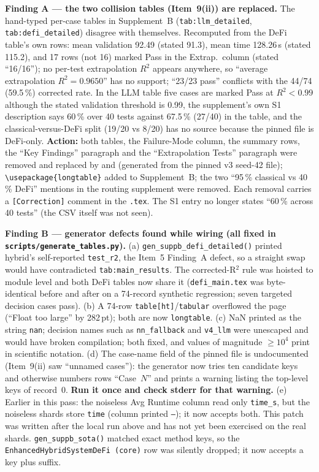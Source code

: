 \documentclass[11pt]{article}
\begin{document}
\textbf{Finding A --- the two collision tables (Item~9(ii)) are replaced.} The hand-typed per-case tables in Supplement~B
(\texttt{tab:llm\_detailed}, \texttt{tab:defi\_detailed}) disagree with themselves. Recomputed from the DeFi table's own
rows: mean validation 92.49 (stated 91.3), mean time 128.26\,s (stated 115.2), and 17 rows (not 16) marked Pass in the
Extrap.\ column (stated ``16/16''); no per-test extrapolation $R^2$ appears anywhere, so ``average extrapolation
$R^2=0.9650$'' has no support; ``23/23 pass'' conflicts with the 44/74 (59.5\,\%) corrected rate. In the LLM table five
cases are marked Pass at $R^2<0.99$ although the stated validation threshold is 0.99, the supplement's own S1 description
says 60\,\% over 40 tests against 67.5\,\% (27/40) in the table, and the classical-versus-DeFi split (19/20 vs 8/20) has
no source because the pinned file is DeFi-only. \textbf{Action:} both tables, the Failure-Mode column, the summary rows,
the ``Key Findings'' paragraph and the ``Extrapolation Tests'' paragraph were removed and replaced by
\verb|| and \verb|| (generated from the pinned v3 seed-42
file); \verb|\usepackage{longtable}| added to Supplement~B; the two ``95\,\% classical vs 40\,\% DeFi'' mentions in the
routing supplement were removed. Each removal carries a \texttt{[Correction]} comment in the \texttt{.tex}. The S1 entry no
longer states ``60\,\% across 40 tests'' (the CSV itself was not seen).

\textbf{Finding B --- generator defects found while wiring (all fixed in \texttt{scripts/generate\_tables.py}).}
(a) \texttt{gen\_suppb\_defi\_detailed()} printed hybrid's self-reported \texttt{test\_r2}, the Item~5 Finding~A defect, so a
straight swap would have contradicted \texttt{tab:main\_results}. The corrected-R$^2$ rule was hoisted to module level and both
DeFi tables now share it (\texttt{defi\_main.tex} was byte-identical before and after on a 74-record synthetic
regression; seven targeted decision cases pass). (b) A 74-row \texttt{table[ht]}/\texttt{tabular} overflowed the page
(``Float too large'' by 282\,pt); both are now \texttt{longtable}. (c) NaN printed as the string \texttt{nan}; decision names
such as \texttt{nn\_fallback} and \texttt{v4\_llm} were unescaped and would have broken compilation; both fixed, and values
of magnitude $\ge10^4$ print in scientific notation. (d) The case-name field of the pinned file is undocumented (Item~9(ii)
saw ``unnamed cases''): the generator now tries ten candidate keys and otherwise numbers rows ``Case~$N$'' and prints a
warning listing the top-level keys of record~0. \textbf{Run it once and check stderr for that warning.} (e) Earlier in
this pass: the noiseless Avg Runtime column read only \texttt{time\_s}, but the noiseless shards store \texttt{time}
(column printed \texttt{---}); it now accepts both. This patch was written after the local run above and has not yet been exercised on the real shards. \texttt{gen\_suppb\_sota()} matched exact method keys, so the
\texttt{EnhancedHybridSystemDeFi (core)} row was silently dropped; it now accepts a key plus suffix.
\end{document}
